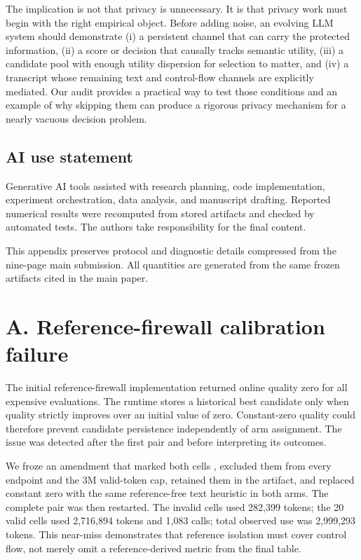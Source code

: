 \documentclass{article}
\begin{document}
The implication is not that privacy is unnecessary. It is that privacy work must begin with the right empirical object. Before adding noise, an evolving LLM system should demonstrate (i) a persistent channel that can carry the protected information, (ii) a score or decision that causally tracks semantic utility, (iii) a candidate pool with enough utility dispersion for selection to matter, and (iv) a transcript whose remaining text and control-flow channels are explicitly mediated. Our audit provides a practical way to test those conditions and an example of why skipping them can produce a rigorous privacy mechanism for a nearly vacuous decision problem.


\subsection*{AI use statement}
Generative AI tools assisted with research planning, code implementation, experiment orchestration,
data analysis, and manuscript drafting. Reported numerical results were recomputed from stored
artifacts and checked by automated tests. The authors take responsibility for the final content.




\clearpage
\appendix

This appendix preserves protocol and diagnostic details compressed from the nine-page main submission. All quantities are generated from the same frozen artifacts cited in the main paper.

\section{A. Reference-firewall calibration failure}

The initial reference-firewall implementation returned online quality zero for all expensive evaluations. The runtime stores a historical best candidate only when quality strictly improves over an initial value of zero. Constant-zero quality could therefore prevent candidate persistence independently of arm assignment. The issue was detected after the first pair and before interpreting its outcomes.

We froze an amendment that marked both cells \texttt{}, excluded them from every endpoint and the 3M valid-token cap, retained them in the artifact, and replaced constant zero with the same reference-free text heuristic in both arms. The complete pair was then restarted. The invalid cells used 282,399 tokens; the 20 valid cells used 2,716,894 tokens and 1,083 calls; total observed use was 2,999,293 tokens. This near-miss demonstrates that reference isolation must cover control flow, not merely omit a reference-derived metric from the final table.
\end{document}
